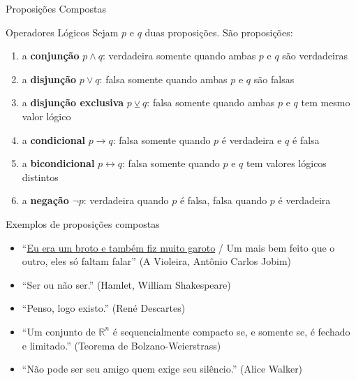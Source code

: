 \begin{frame}[fragile]{Proposições Compostas}

    \begin{block}{Operadores Lógicos}
        Sejam $p$ e $q$ duas proposições. São proposições:
        \begin{enumerate}
            \item a \textbf{conjunção} $p \land q$: verdadeira somente quando ambas $p$ e $q$ são verdadeiras
            \item a \textbf{disjunção} $p \lor q$: falsa somente quando ambas $p$ e $q$ são falsas
            \item a \textbf{disjunção exclusiva} $p \veebar q$: falsa somente quando ambas $p$ e $q$ tem mesmo valor lógico
            \item a \textbf{condicional} $p \to q$: falsa somente quando $p$ é verdadeira e $q$ é falsa
            \item a \textbf{bicondicional} $p \leftrightarrow q$: falsa somente quando $p$ e $q$ tem valores lógicos distintos
            \item a \textbf{negação} $\lnot p$: verdadeira quando $p$ é falsa, falsa quando $p$ é verdadeira
        \end{enumerate}
    \end{block}

\end{frame}

\begin{frame}[fragile]{Exemplos de proposições compostas}

    \begin{itemize}
        \item ``\underline{Eu era um broto e também fiz muito garoto} / 
            Um mais bem feito que o outro, eles só faltam falar'' (A Violeira, Antônio Carlos Jobim)
        \item ``Ser ou não ser.'' (Hamlet, William Shakespeare)
        \item ``Penso, logo existo.'' (René Descartes)
        \item ``Um conjunto de $\mathbb{R}^{n}$ é sequencialmente compacto se, e somente se, é fechado e limitado.'' (Teorema de Bolzano-Weierstrass) 
        \item ``Não pode ser seu amigo quem exige seu silêncio.'' (Alice Walker)
    \end{itemize}

\end{frame}

